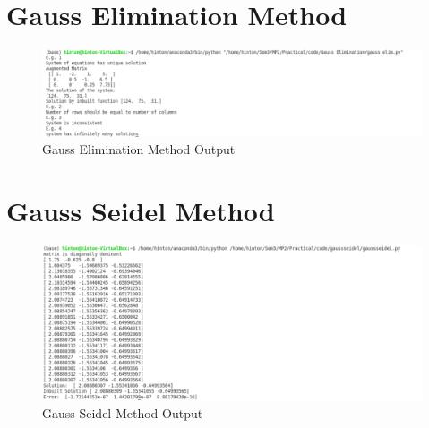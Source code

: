 \documentclass{article}
\begin{document}
\clearpage
\section{Gauss Elimination Method}


\begin{figure}[h]
    \centering
    \includegraphics[width=14cm,height=5cm \textwidth]{Gauss_Elimination/Capture.PNG}
\caption{Gauss Elimination Method Output}
\end{figure}


\clearpage
\section{Gauss Seidel Method}


\newpage
\begin{figure}[h]
    \centering
    \includegraphics[width=15cm,height=8cm \textwidth]{Gauss_Seidel/Capture.PNG}
\caption{Gauss Seidel Method Output}
\end{figure}
\end{document}
